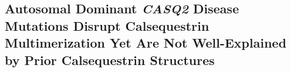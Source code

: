 \newcommand{\headingsubsectionone}{Autosomal Dominant \textit{CASQ2} Disease Mutations Disrupt Calsequestrin Multimerization Yet Are Not Well-Explained by Prior Calsequestrin Structures}
\newcommand{\headingsubsectiontwo}{The New Cardiac Calsequestrin Filament Candidate Is Helical at the Domain Level}
\newcommand{\headingsubsectionthree}{The 3-Helix Configuration of the New Filament Candidate Promotes Close-Packing of Thioredoxin Domains}
%
\newcommand{\headingsubsectionfourandfive}{Lanthanide Substitution Reveals the Biochemical Basis of Cation-Driven Filament Assembly}
\newcommand{\headingsubsubsectionfour}{Cation Binding Leads to Conformational Shifts in Calsequestrin Dimers}
\newcommand{\headingsubsubsectionfive}{Cations Are Trapped at Inter-Dimer Filament-Forming Interfaces}
%
\newcommand{\headingsubsectionsix}{The Cardiac Calsequestrin Filament Contains a Continuous, Solvent-Accessible Lumen Along Its Long Axis}
\newcommand{\headingsubsectionseven}{Dominant Disease Mutations Disrupt Cardiac Calsequestrin's Filament-Forming Interface}

\subsection{\headingsubsectionone}

